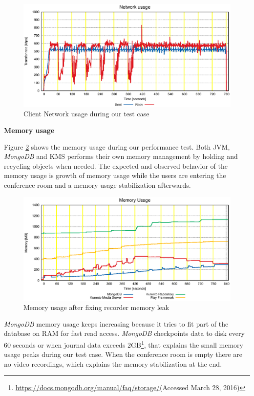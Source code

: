 \documentclass[conference,compsoc,a4paper]{IEEEtran}
\begin{document}
\begin{figure}
  \centering
  \includegraphics[width=\linewidth]{stats/test_client_net.eps}
  \caption{Client Network usage during our test case}
  \label{fig:test_client_net}
\end{figure}



\textbf{Memory usage}


Figure \ref{fig:test_ram_fixed_mem} shows the memory usage during our performance test. Both \gls{JVM}, \emph{MongoDB} and \gls{KMS} performs their own memory management by holding and recycling objects when needed. The expected and observed behavior of the memory usage is growth of memory usage while the users are entering the conference room and a memory usage stabilization afterwards.


\begin{figure}
  \centering
  \includegraphics[width=\linewidth]{stats/test_ram_fixed_mem.eps}
  \caption{Memory usage after fixing recorder memory leak}
  \label{fig:test_ram_fixed_mem}
\end{figure}

\emph{MongoDB} memory usage keeps increasing because it tries to fit part of the database on \gls{RAM} for fast read access. \emph{MongoDB} checkpoints data to disk every 60 seconds or when journal data exceeds 2GB\footnote{\url{https://docs.mongodb.org/manual/faq/storage/}(Accessed March 28, 2016)}, that explains the small memory usage peaks during our test case. When the conference room is empty there are no video recordings, which explains the memory stabilization at the end.
\end{document}
